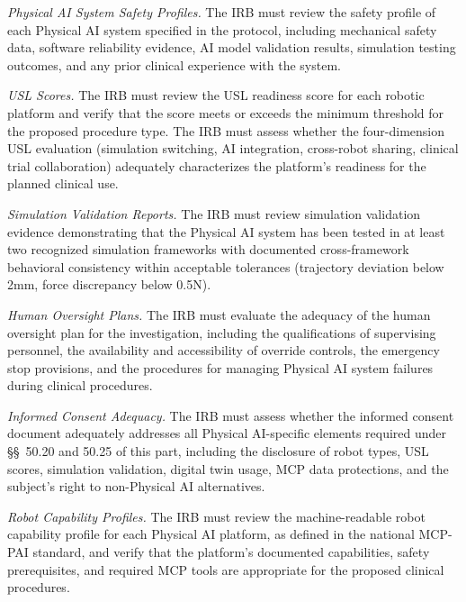 \begin{description}[leftmargin=1.0cm,style=sameline]
\item[(1)] \textit{Physical AI System Safety Profiles.} The IRB must review the safety profile of each Physical AI system specified in the protocol, including mechanical safety data, software reliability evidence, AI model validation results, simulation testing outcomes, and any prior clinical experience with the system.
\item[(2)] \textit{USL Scores.} The IRB must review the USL readiness score for each robotic platform and verify that the score meets or exceeds the minimum threshold for the proposed procedure type. The IRB must assess whether the four-dimension USL evaluation (simulation switching, AI integration, cross-robot sharing, clinical trial collaboration) adequately characterizes the platform's readiness for the planned clinical use.
\item[(3)] \textit{Simulation Validation Reports.} The IRB must review simulation validation evidence demonstrating that the Physical AI system has been tested in at least two recognized simulation frameworks with documented cross-framework behavioral consistency within acceptable tolerances (trajectory deviation below 2mm, force discrepancy below 0.5N).
\item[(4)] \textit{Human Oversight Plans.} The IRB must evaluate the adequacy of the human oversight plan for the investigation, including the qualifications of supervising personnel, the availability and accessibility of override controls, the emergency stop provisions, and the procedures for managing Physical AI system failures during clinical procedures.
\item[(5)] \textit{Informed Consent Adequacy.} The IRB must assess whether the informed consent document adequately addresses all Physical AI-specific elements required under \S\S~50.20 and 50.25 of this part, including the disclosure of robot types, USL scores, simulation validation, digital twin usage, MCP data protections, and the subject's right to non-Physical AI alternatives.
\item[(6)] \textit{Robot Capability Profiles.} The IRB must review the machine-readable robot capability profile for each Physical AI platform, as defined in the national MCP-PAI standard, and verify that the platform's documented capabilities, safety prerequisites, and required MCP tools are appropriate for the proposed clinical procedures.
\end{description}

